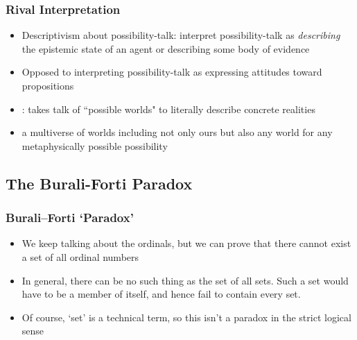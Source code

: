 \begin{frame}
\frametitle{Rival Interpretation}

\begin{itemize}[<+->]

\item Descriptivism about possibility-talk: interpret possibility-talk as \textit{describing} the epistemic state of an agent or describing some body of evidence

\item Opposed to interpreting possibility-talk as expressing attitudes toward propositions 

\item {}: takes talk of ``possible worlds" to literally describe concrete realities 
\item[] a multiverse of worlds including not only ours but also any world for any metaphysically possible possibility 

\end{itemize}
\end{frame}


\fi %




\iffalse %


\subsection{The Burali-Forti Paradox}

\begin{frame}
\frametitle{Burali--Forti `Paradox'}

\begin{itemize}[<+->]

\item We keep talking about the ordinals, but we can prove that there cannot exist a set of all ordinal numbers

\item In general, there can be no such thing as the set of all sets. Such a set would have to be a member of itself, and hence fail to contain every set.

\item Of course, `set' is a technical term, so this isn't a paradox in the strict logical sense

\end{itemize}
\end{frame}

